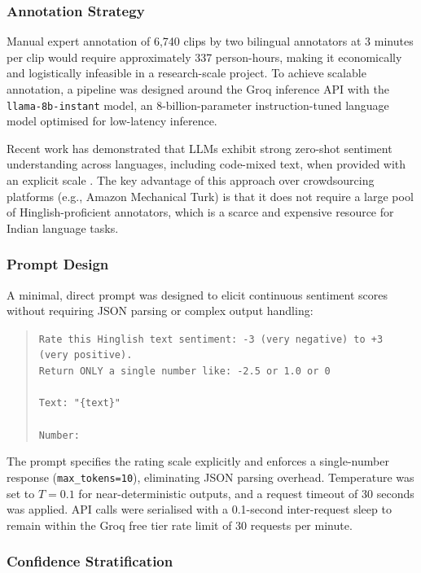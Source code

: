\subsubsection{Annotation Strategy}

Manual expert annotation of 6,740 clips by two bilingual annotators at 3 minutes per clip would require approximately 337 person-hours, making it economically and logistically infeasible in a research-scale project. To achieve scalable annotation, a pipeline was designed around the Groq inference API with the \texttt{llama\allowbreak-8b\allowbreak-instant} model, an 8-billion-parameter instruction-tuned language model optimised for low-latency inference.

Recent work has demonstrated that LLMs exhibit strong zero-shot sentiment understanding across languages, including code-mixed text, when provided with an explicit scale \cite{touvron2023llama}. The key advantage of this approach over crowdsourcing platforms (e.g., Amazon Mechanical Turk) is that it does not require a large pool of Hinglish-proficient annotators, which is a scarce and expensive resource for Indian language tasks.

\subsubsection{Prompt Design}

A minimal, direct prompt was designed to elicit continuous sentiment scores without requiring JSON parsing or complex output handling:

\begin{quote}
\texttt{Rate this Hinglish text sentiment: -3 (very negative) to +3 (very positive).\\
Return ONLY a single number like: -2.5 or 1.0 or 0\\
\\
Text: "\{text\}"\\
\\
Number:}
\end{quote}

The prompt specifies the rating scale explicitly and enforces a single-number response (\texttt{max\_tokens=10}), eliminating JSON parsing overhead. Temperature was set to $T=0.1$ for near-deterministic outputs, and a request timeout of 30 seconds was applied. API calls were serialised with a 0.1-second inter-request sleep to remain within the Groq free tier rate limit of 30 requests per minute.

\subsubsection{Confidence Stratification}

